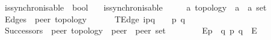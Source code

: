 \begin{isabellebody}
\ is{\isacharunderscore}{\kern0pt}synchronisable\ {\isacharcolon}{\kern0pt}{\isacharcolon}{\kern0pt}\ {\isachardoublequoteopen}bool{\isachardoublequoteclose}\ \isanewline
\ \ {\isachardoublequoteopen}is{\isacharunderscore}{\kern0pt}synchronisable\ {\isasymequiv}\ {\isasymL}\isactrlsub {\isasyminfinity}\ {\isacharequal}{\kern0pt}\ {\isasymL}\isactrlsub {\isasymzero}{\isachardoublequoteclose}\isanewline
\isanewline
{}\isamarkupfalse%
\ {\isacharprime}{\kern0pt}a\ topology\ {\isacharequal}{\kern0pt}\ {\isachardoublequoteopen}{\isacharparenleft}{\kern0pt}{\isacharprime}{\kern0pt}a\ {\isasymtimes}\ {\isacharprime}{\kern0pt}a{\isacharparenright}{\kern0pt}\ set{\isachardoublequoteclose}\isanewline
\isanewline
%
\isanewline
{}\isamarkupfalse%
\ Edges\ {\isacharcolon}{\kern0pt}{\isacharcolon}{\kern0pt}\ {\isachardoublequoteopen}{\isacharprime}{\kern0pt}peer\ topology{\isachardoublequoteclose}\ \ {\isacharparenleft}{\kern0pt}{\isachardoublequoteopen}{\isasymG}{\isachardoublequoteclose}\ {}{}{}{\isacharparenright}{\kern0pt}\ \isanewline
\ \ TEdge{\isacharcolon}{\kern0pt}\ {\isachardoublequoteopen}i\isactrlbsup p{\isasymrightarrow}q\isactrlesup \ {\isasymin}\ {\isasymM}\ {\isasymLongrightarrow}\ {\isacharparenleft}{\kern0pt}p{\isacharcomma}{\kern0pt}\ q{\isacharparenright}{\kern0pt}\ {\isasymin}\ {\isasymG}{\isachardoublequoteclose}\isanewline
\isanewline
{}\isamarkupfalse%
\ Successors\ {\isacharcolon}{\kern0pt}{\isacharcolon}{\kern0pt}\ {\isachardoublequoteopen}{\isacharprime}{\kern0pt}peer\ topology\ {\isasymRightarrow}\ {\isacharprime}{\kern0pt}peer\ {\isasymRightarrow}\ {\isacharprime}{\kern0pt}peer\ set{\isachardoublequoteclose}\ \ {\isacharparenleft}{\kern0pt}{\isachardoublequoteopen}{\isacharunderscore}{\kern0pt}{\isasymlangle}{\isacharunderscore}{\kern0pt}{\isasymrightarrow}{\isasymrangle}{\isachardoublequoteclose}\ {\isacharbrackleft}{\kern0pt}{}{}{\isacharcomma}{\kern0pt}\ {}{}{\isacharbrackright}{\kern0pt}\ {}{}{}{\isacharparenright}{\kern0pt}\ \isanewline
\ \ {\isachardoublequoteopen}E{\isasymlangle}p{\isasymrightarrow}{\isasymrangle}\ {\isasymequiv}\ {\isacharbraceleft}{\kern0pt}q{\isachardot}{\kern0pt}\ {\isacharparenleft}{\kern0pt}p{\isacharcomma}{\kern0pt}\ q{\isacharparenright}{\kern0pt}\ {\isasymin}\ E{\isacharbraceright}{\kern0pt}{\isachardoublequoteclose}\isanewline

\end{isabellebody}
